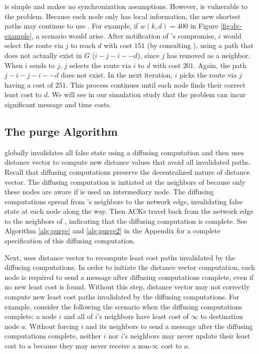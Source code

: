 \second is simple and makes no synchronization assumptions. %
However, \second is vulnerable to the \infinity problem. Because each node only has local information, the new shortest paths may continue to use \bads.
For example, if $w(k,d)=400$ in Figure \ref{fig:dv-example}, a \infinity scenario would arise. After notification of \bads's compromise, 
$i$ would select the route via $j$ to reach $d$ with cost $151$ (by consulting \dmatrixis), using a path that does not actually exist in $G$ ($i-j-i-$\bads$-d$), since $j$ has removed \bad as a 
neighbor. When $i$ sends \minvi to $j$, $j$ selects the route via $i$
to $d$ with cost $201$. Again, the path $j-i-j-i-$\bads$-d$ does not exist.  In the next iteration, $i$ 
picks the route via $j$ having a cost of $251$. This process continues until each node finds their 
correct least cost to $d$.  We will see in our simulation study that the \infinity problem can incur significant message and time costs.




\subsection{The purge Algorithm}
\label{subsec:purge}


\purge globally invalidates all false state using a diffusing computation and then uses distance vector to compute new distance values that avoid all invalidated paths.
Recall that diffusing computations preserve the decentralized nature of distance vector.
The diffusing computation is initiated at the neighbors of \bad because only these nodes are 
aware if \bad is used an intermediary node. The diffusing computations spread from \bads's neighbors to the network edge, invalidating false state at each node along the way. 
Then ACKs travel back from the network edge to the neighbors of \bads, indicating that the diffusing computation is complete. 
See Algorithm \ref{alg:purge} and \ref{alg:purge2} in the Appendix for a complete specification of this diffusing computation.

Next, \purge uses distance vector to recompute least cost paths invalidated by the diffusing computations.  In order to initiate the distance vector computation, each 
node is required to send a message after diffusing computations complete, even if no new least cost is found.  Without this step, distance vector may not correctly compute new least cost 
paths invalidated by the diffusing computations.  For example, consider the following the scenario when the diffusing computations complete: a node $i$ and all of $i$'s neighbors have 
least cost of $\infty$ to destination node $a$. Without forcing $i$ and its neighbors to send a message after the diffusing computations complete, neither $i$ nor $i$'s neighbors may
never update their least cost to $a$ because they may never receive a non-$\infty$ cost to $a$.

